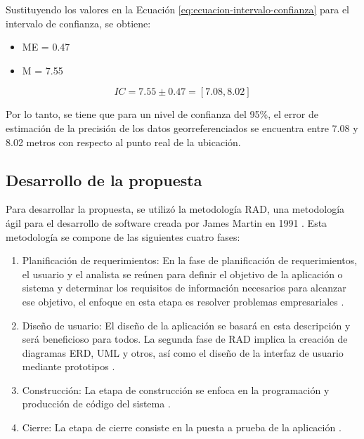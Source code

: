 Sustituyendo los valores en la Ecuación \ref{eq:ecuacion-intervalo-confianza} para el intervalo de confianza, se obtiene:

\begin{itemize}
    \item ME = 0.47
    \item M = 7.55
\end{itemize}

\begin{equation}
    IC = 7.55 \pm 0.47 = [7.08, 8.02]
    \label{eq:ecuacion-resultado-intervalo-confianza}
\end{equation}

Por lo tanto, se tiene que para un nivel de confianza del 95\%, el error de estimación de la precisión de los datos georreferenciados
se encuentra entre 7.08 y 8.02 metros con respecto al punto real de la ubicación.

\subsection{Desarrollo de la propuesta}
Para desarrollar la propuesta, se utilizó la metodología RAD, una metodología ágil para el desarrollo de software
creada por James Martin en 1991 \cite{agrawalUSINGRAPIDAPPLICATION2019}. Esta metodología se compone de las
siguientes cuatro fases:

\begin{enumerate}
    \item Planificación de requerimientos: En la fase de planificación de requerimientos, el usuario y el analista
          se reúnen para definir el objetivo de la aplicación o sistema y determinar los requisitos de información
          necesarios para alcanzar ese objetivo, el enfoque en esta etapa es resolver problemas empresariales \cite{maulanyDesignLearningApplications2021}.
    \item Diseño de usuario: El diseño de la aplicación se basará en esta descripción y será beneficioso para
          todos. La segunda fase de RAD implica la creación de diagramas ERD, UML y otros, así como el diseño de
          la interfaz de usuario mediante prototipos \cite{maulanyDesignLearningApplications2021}.
    \item Construcción: La etapa de construcción se enfoca en la programación y producción de código del sistema \cite{fauziSystematicLiteratureReviews2023}.
    \item Cierre: La etapa de cierre consiste en la puesta a prueba de la aplicación \cite{fauziSystematicLiteratureReviews2023}.
\end{enumerate}


